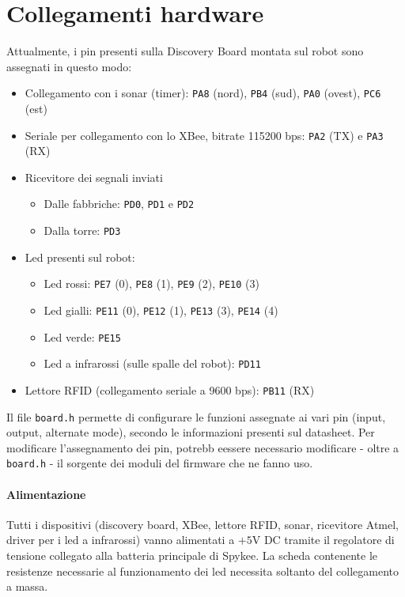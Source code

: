 \section{Collegamenti hardware}
Attualmente, i pin presenti sulla Discovery Board montata sul robot sono assegnati in questo modo:
\begin{itemize}
\item Collegamento con i sonar (timer): \verb|PA8| (nord), \verb|PB4| (sud), \verb|PA0| (ovest), \verb|PC6| (est)
\item Seriale per collegamento con lo XBee, bitrate 115200 bps: \verb|PA2| (TX) e \verb|PA3| (RX)
\item Ricevitore dei segnali inviati
	\begin{itemize}
	\item Dalle fabbriche: \verb|PD0|, \verb|PD1| e \verb|PD2|
	\item Dalla torre: \verb|PD3|
	\end{itemize}
\item Led presenti sul robot:
	\begin{itemize}
	\item Led rossi: \verb|PE7| (0), \verb|PE8| (1), \verb|PE9| (2), \verb|PE10| (3)
	\item Led gialli: \verb|PE11| (0), \verb|PE12| (1), \verb|PE13| (3), \verb|PE14| (4)
	\item Led verde: \verb|PE15|
	\item Led a infrarossi (sulle spalle del robot): \verb|PD11|
	\end{itemize}
\item Lettore RFID (collegamento seriale a 9600 bps): \verb|PB11| (RX)
\end{itemize}
\begin{nota}
Il file \verb|board.h| permette di configurare le funzioni assegnate ai vari pin (input, output, alternate mode), secondo le informazioni presenti sul datasheet. Per modificare l'assegnamento dei pin, potrebb eessere necessario modificare - oltre a \verb|board.h| - il sorgente dei moduli del firmware che ne fanno uso.
\end{nota}

\paragraph{Alimentazione} Tutti i dispositivi (discovery board, XBee, lettore RFID, sonar, ricevitore Atmel, driver per i led a infrarossi) vanno alimentati a $+5$V DC tramite il regolatore di tensione collegato alla batteria principale di Spykee. La scheda contenente le resistenze necessarie al funzionamento dei led necessita soltanto del collegamento a massa.

